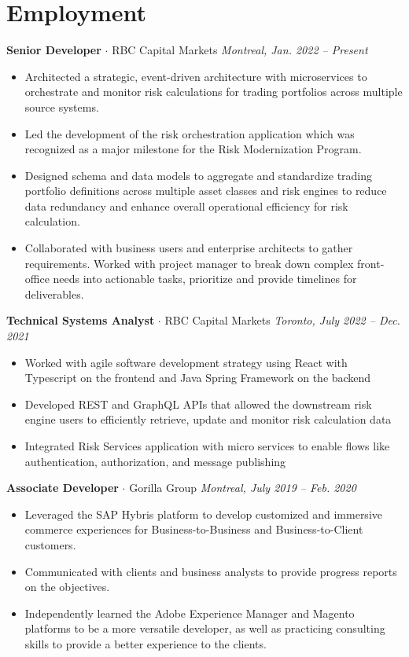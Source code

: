 \documentclass[a4paper,10pt]{article}
\newcommand{\jobentry}[4]{
    \noindent
    \textbf{\large#3}{ $\cdot$ }{#1} \hfill \textit{#2, #4}
    \vspace{-0.5em} %
}
\begin{document}
\section*{Employment}
\jobentry{RBC Capital Markets}{Montreal}{Senior Developer}{Jan. 2022 – Present}
\begin{itemize}[left=0em]
    \item Architected a strategic, event-driven architecture with microservices to orchestrate and monitor risk calculations for trading portfolios across multiple source systems.
    \item Led the development of the risk orchestration application which was recognized as a major milestone for the Risk Modernization Program.
    \item Designed schema and data models to aggregate and standardize trading portfolio definitions across multiple asset classes and risk engines to reduce data redundancy and enhance overall operational efficiency for risk calculation.
    \item Collaborated with business users and enterprise architects to gather requirements. Worked with project manager to break down complex front-office needs into actionable tasks, prioritize and provide timelines for deliverables.
\end{itemize}
\vspace{0.5em}
\jobentry{RBC Capital Markets}{Toronto}{Technical Systems Analyst}{July 2022 – Dec. 2021}
\begin{itemize}[left=0em]
    \item Worked with agile software development strategy using React with Typescript on the frontend and Java Spring Framework on the backend
    \item Developed REST and GraphQL APIs that allowed the downstream risk engine users to efficiently retrieve, update and monitor risk calculation data
    \item Integrated Risk Services application with micro services to enable flows like authentication, authorization, and message publishing
\end{itemize}
\vspace{0.5em}
\jobentry{Gorilla Group}{Montreal}{Associate Developer}{July 2019 – Feb. 2020}
\begin{itemize}[left=0em]
    \item Leveraged the SAP Hybris platform to develop customized and immersive commerce experiences for Business-to-Business and Business-to-Client customers.
    \item Communicated with clients and business analysts to provide progress reports on the objectives.
    \item Independently learned the Adobe Experience Manager and Magento platforms to be a more versatile developer, as well as practicing consulting skills to provide a better experience to the clients.
\end{itemize}
\end{document}
